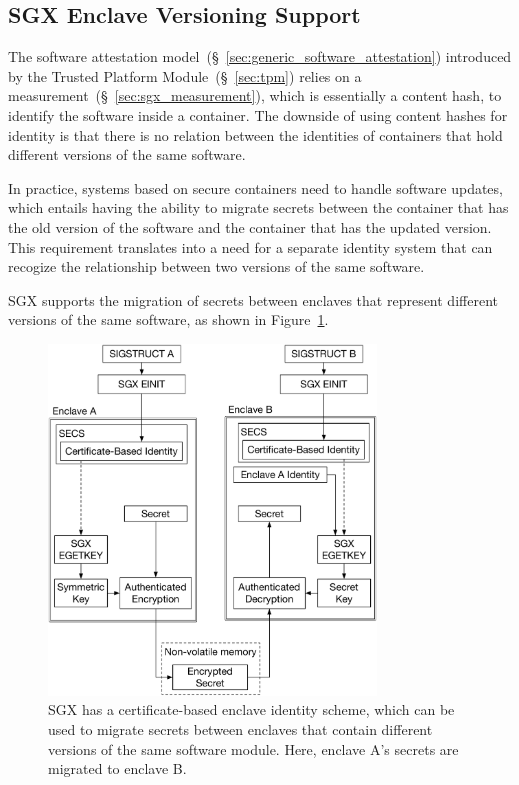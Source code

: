 \subsection{SGX Enclave Versioning Support}
\label{sec:sgx_versioning}

The software attestation model~(\S~\ref{sec:generic_software_attestation})
introduced by the Trusted Platform Module~(\S~\ref{sec:tpm}) relies on a
measurement~(\S~\ref{sec:sgx_measurement}), which is essentially a content
hash, to identify the software inside a container. The downside of using
content hashes for identity is that there is no relation between the identities
of containers that hold different versions of the same software.

In practice, systems based on secure containers need to handle software
updates, which entails having the ability to migrate secrets between the
container that has the old version of the software and the container that has
the updated version. This requirement translates into a need for a separate
identity system that can recogize the relationship between two versions of the
same software.

SGX supports the migration of secrets between enclaves that represent different
versions of the same software, as shown in
Figure~\ref{fig:sgx_secret_migration}.

\begin{figure}[hbt]
  \centering
  \includegraphics[width=87mm]{figures/sgx_secret_migration.pdf}
  \caption{
    SGX has a certificate-based enclave identity scheme, which can be used to
    migrate secrets between enclaves that contain different versions of the
    same software module. Here, enclave A's secrets are migrated to enclave B.
  }
  \label{fig:sgx_secret_migration}
\end{figure}

